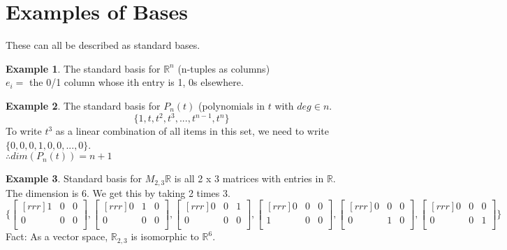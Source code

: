 \documentclass{report}
\theoremstyle{plain}
\theoremstyle{definition}
\newtheorem*{ex}{Example}
\theoremstyle{plain}
\begin{document}
\section{Examples of Bases}
These can all be described as standard bases.
\begin{ex}
The standard basis for $\mathbb{R}^n$ (n-tuples as columns)\\
$e_i = $ the 0/1 column whose ith entry is 1, 0s elsewhere.
\end{ex}
\begin{ex} The standard basis for $P_n(t)$ (polynomials in $t$ with $deg\in n$.
\[ \{1,t,t^2,t^3,...,t^{n-1},t^n\} \]
To write $t^3$ as a linear combination of all items in this set, we need to write $\{ 0,0,0,1,0,0,...,0\}$.\\
$\therefore dim(P_n(t)) = n+1$
\end{ex}
\begin{ex}
Standard basis for $M_{2,3}\mathbb{R}$ is all 2 x 3 matrices with entries in $\mathbb{R}$.\\
The dimension is 6. We get this by taking 2 times 3.
\[ \{\begin{bmatrix}[rrr]1&0&0\\0&0&0\\\end{bmatrix},\begin{bmatrix}[rrr]0&1&0\\0&0&0\\\end{bmatrix}, \begin{bmatrix}[rrr]0&0&1\\0&0&0\\\end{bmatrix}, \begin{bmatrix}[rrr]0&0&0\\1&0&0\\\end{bmatrix}, \begin{bmatrix}[rrr]0&0&0\\0&1&0\\\end{bmatrix}, \begin{bmatrix}[rrr]0&0&0\\0&0&1\\\end{bmatrix}\} \]
Fact: As a vector space, $\mathbb{R}_{2,3}$ is isomorphic to $\mathbb{R}^6$.
\end{ex}
\end{document}
